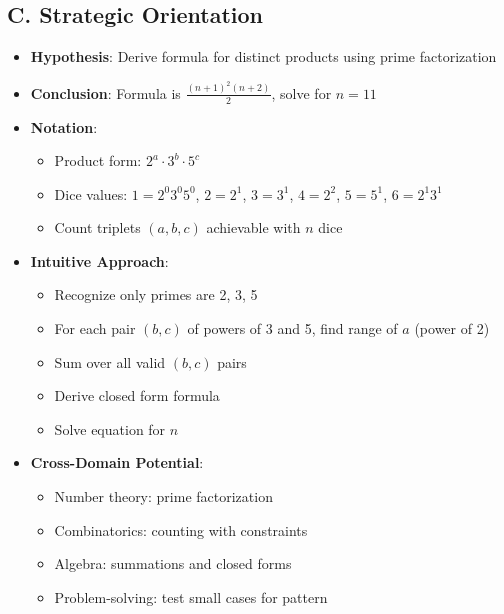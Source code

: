 \documentclass[12pt]{article}
\begin{document}
\begin{problemconfigbox}
\subsection*{C. Strategic Orientation}
\begin{itemize}[leftmargin=*]
    \item \textbf{Hypothesis}: Derive formula for distinct products using prime factorization
    \item \textbf{Conclusion}: Formula is $\frac{(n+1)^2(n+2)}{2}$, solve for $n = 11$
    \item \textbf{Notation}: 
    \begin{itemize}
        \item Product form: $2^a \cdot 3^b \cdot 5^c$
        \item Dice values: $1 = 2^0 3^0 5^0$, $2 = 2^1$, $3 = 3^1$, $4 = 2^2$, $5 = 5^1$, $6 = 2^1 3^1$
        \item Count triplets $(a, b, c)$ achievable with $n$ dice
    \end{itemize}
    \item \textbf{Intuitive Approach}: 
    \begin{itemize}
        \item Recognize only primes are 2, 3, 5
        \item For each pair $(b, c)$ of powers of 3 and 5, find range of $a$ (power of 2)
        \item Sum over all valid $(b, c)$ pairs
        \item Derive closed form formula
        \item Solve equation for $n$
    \end{itemize}
    \item \textbf{Cross-Domain Potential}: 
    \begin{itemize}
        \item Number theory: prime factorization
        \item Combinatorics: counting with constraints
        \item Algebra: summations and closed forms
        \item Problem-solving: test small cases for pattern
    \end{itemize}
\end{itemize}
\end{problemconfigbox}
\end{document}
